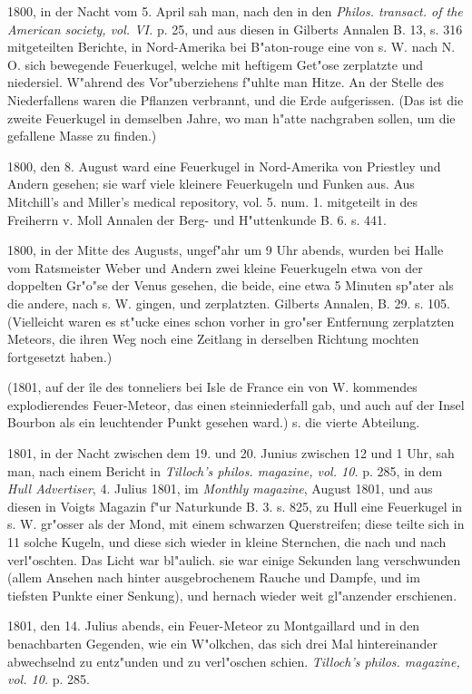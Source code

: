 \documentclass[a4paper, 11pt, oneside, polutonikogreek, german]{article}
\begin{document}
1800, in der Nacht vom 5. April sah man, nach den in den \emph{Philos. transact. of the American society, vol. VI.} p. 25, und aus diesen in Gilberts Annalen B. 13, s. 316 mitgeteilten Berichte, in Nord-Amerika bei B"aton-rouge eine von s. W. nach N. O. sich bewegende Feuerkugel, welche mit heftigem Get"ose zerplatzte und niedersiel. W"ahrend des Vor"uberziehens f"uhlte man Hitze. An der Stelle des Niederfallens waren die Pflanzen verbrannt, und die Erde aufgerissen. (Das ist die zweite Feuerkugel in demselben Jahre, wo man h"atte nachgraben sollen, um die gefallene Masse zu finden.)

1800, den 8. August ward eine Feuerkugel in Nord-Amerika von Priestley und Andern gesehen; sie warf viele kleinere Feuerkugeln und Funken aus. Aus Mitchill's and Miller's medical repository, vol. 5. num. 1. mitgeteilt in des Freiherrn v. Moll Annalen der Berg- und H"uttenkunde B. 6. s. 441.

1800, in der Mitte des Augusts, ungef"ahr um 9 Uhr abends, wurden bei Halle vom Ratsmeister Weber und Andern zwei kleine Feuerkugeln etwa von der doppelten Gr"o"se der Venus gesehen, die beide, eine etwa 5 Minuten sp"ater als die andere, nach s. W. gingen, und zerplatzten. Gilberts Annalen, B. 29. s. 105. (Vielleicht waren es st"ucke eines schon vorher in gro"ser Entfernung zerplatzten Meteors, die ihren Weg noch eine Zeitlang in derselben Richtung mochten fortgesetzt haben.)

(1801, auf der île des tonneliers bei Isle de France ein von W. kommendes explodierendes Feuer-Meteor, das einen steinniederfall gab, und auch auf der Insel Bourbon als ein leuchtender Punkt gesehen ward.) s. die vierte Abteilung.

1801, in der Nacht zwischen dem 19. und 20. Junius zwischen 12 und 1 Uhr, sah man, nach einem Bericht in \emph{Tilloch's philos. magazine, vol. 10.} p. 285, in dem \emph{Hull Advertiser}, 4. Julius 1801, im \emph{Monthly magazine}, August 1801, und aus diesen in Voigts Magazin f"ur Naturkunde B. 3. s. 825, zu Hull eine Feuerkugel in s. W. gr"osser als der Mond, mit einem schwarzen Querstreifen; diese teilte sich in 11 solche Kugeln, und diese sich wieder in kleine Sternchen, die nach und nach verl"oschten. Das Licht war bl"aulich. sie war einige Sekunden lang verschwunden (allem Ansehen nach hinter ausgebrochenem Rauche und Dampfe, und im tiefsten Punkte einer Senkung), und hernach wieder weit gl"anzender erschienen.

1801, den 14. Julius abends, ein Feuer-Meteor zu Montgaillard und in den benachbarten Gegenden, wie ein W"olkchen, das sich drei Mal hintereinander abwechselnd zu entz"unden und zu verl"oschen schien. \emph{Tilloch's philos. magazine, vol. 10.} p. 285.
\end{document}
